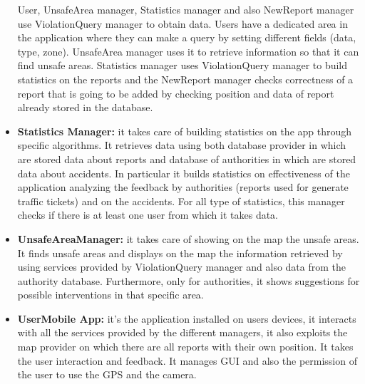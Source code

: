 \documentclass[../RASD.tex]{subfiles}
\begin{document}
\begin{itemize}
        User, UnsafeArea manager, Statistics manager and also NewReport manager use ViolationQuery manager to obtain data.
        Users have a dedicated area in the application where they can make a query by setting different fields (data, type, zone).
        UnsafeArea manager uses it to retrieve information so that it can find unsafe areas.
        Statistics manager uses ViolationQuery manager to build statistics on the reports and the NewReport manager checks correctness of a report
        that is going to be added by checking position and data of report already stored in the database.
        \item \textbf{Statistics Manager:} it takes care of building statistics on the app through specific algorithms.
        It retrieves data using both database provider in which are stored data about reports and database of authorities in which are stored data about accidents.
        In particular it builds statistics on effectiveness of the application analyzing the feedback by authorities (reports used for generate traffic tickets)
        and on the accidents.
        For all type of statistics, this manager checks if there is at least one user from which it takes data.
        \item \textbf{UnsafeAreaManager:} it takes care of showing on the map the unsafe areas.
        It finds unsafe areas and displays on the map the information retrieved by using services provided by ViolationQuery manager
        and also data from the authority database.
        Furthermore, only for authorities, it shows suggestions for possible interventions in that specific area.
        \item \textbf{UserMobile App:} it’s the application installed on users devices, it interacts with all the services provided by the different managers,
        it also exploits the map provider on which there are all reports with their own position.
        It takes the user interaction and feedback.
        It manages GUI and also the permission of the user to use the GPS and the camera.
    \end{itemize}
\end{document}
